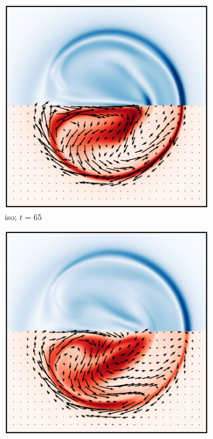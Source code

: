 \begin{figure}[t]
  \begin{subfigure}[t]{0.32\textwidth}
    \centering
    \includegraphics[width=\linewidth]{slices/final_isotropic_current_density_0013.pdf}
    \caption{iso; $t=65$}
    \label{fig:final_isotropic_current_density_0013}
  \end{subfigure}
  \hfill
  \begin{subfigure}[t]{0.32\textwidth}
    \centering
    \includegraphics[width=\linewidth]{slices/final_isotropic_current_density_0015.pdf}

\end{subfigure}
\end{figure}

